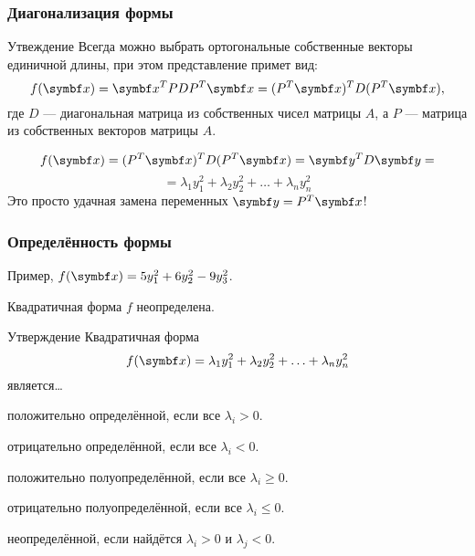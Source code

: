 \begin{frame}
    \frametitle{Диагонализация формы}
\begin{block}{Утвеждение}
    Всегда можно выбрать ортогональные собственные векторы единичной длины, 
    при этом представление примет вид:
    \[
    f(\bx) = \bx^T PDP^T \bx = (P^T \bx)^T D (P^T \bx),    
    \] 
    где $D$ — диагональная матрица из собственных чисел матрицы $A$, 
    а $P$ — матрица из собственных векторов матрицы $A$.
\end{block}
    \pause
    \[
    f(\bx) =  (P^T \bx)^T D (P^T \bx) = \by^T D \by = 
    \]
    \[
    = \lambda_1 y_1^2 + \lambda_2 y_2^2 + \ldots + \lambda_n y_n^2
    \]
    \pause
    Это просто удачная замена переменных $\by=P^T \bx$!
\end{frame}

\begin{frame}
    \frametitle{Определённость формы}
    Пример, $f(\bx) = 5 y_1^2 + 6y_2^2 - 9y_3^2$. \pause

    Квадратичная форма $f$ неопределена. 
    \pause
\begin{block}{Утверждение}
    Квадратичная форма 
    \[
      f(\bx) = \lambda_1 y_1^2 + \lambda_2 y_2^2 + \ldots + \lambda_n y_n^2  
    \]
    является\ldots\pause 

    положительно определённой, если все $\lambda_i >0$.\pause

    отрицательно определённой, если все $\lambda_i <0$.\pause

    положительно полуопределённой, если все $\lambda_i \geq 0$.\pause

    отрицательно полуопределённой, если все $\lambda_i \leq 0$.\pause

    неопределённой, если найдётся $\lambda_i >0$ и $\lambda_j < 0$.
\end{block}

\end{frame}

